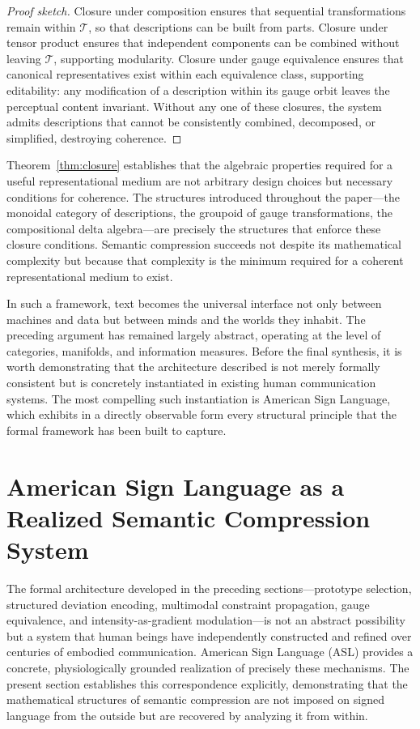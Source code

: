 \documentclass[11pt,a4paper]{article}
\theoremstyle{definition}
\theoremstyle{remark}
\begin{document}
\begin{proof}[Proof sketch]
Closure under composition ensures that sequential transformations remain within $\mathcal{T}$, so that descriptions can be built from parts. Closure under tensor product ensures that independent components can be combined without leaving $\mathcal{T}$, supporting modularity. Closure under gauge equivalence ensures that canonical representatives exist within each equivalence class, supporting editability: any modification of a description within its gauge orbit leaves the perceptual content invariant. Without any one of these closures, the system admits descriptions that cannot be consistently combined, decomposed, or simplified, destroying coherence.
\end{proof}

Theorem~\ref{thm:closure} establishes that the algebraic properties required for a useful representational medium are not arbitrary design choices but necessary conditions for coherence. The structures introduced throughout the paper---the monoidal category of descriptions, the groupoid of gauge transformations, the compositional delta algebra---are precisely the structures that enforce these closure conditions. Semantic compression succeeds not despite its mathematical complexity but because that complexity is the minimum required for a coherent representational medium to exist.

In such a framework, text becomes the universal interface not only between machines and data but between minds and the worlds they inhabit. The preceding argument has remained largely abstract, operating at the level of categories, manifolds, and information measures. Before the final synthesis, it is worth demonstrating that the architecture described is not merely formally consistent but is concretely instantiated in existing human communication systems. The most compelling such instantiation is American Sign Language, which exhibits in a directly observable form every structural principle that the formal framework has been built to capture.

\section{American Sign Language as a Realized Semantic Compression System}
\label{sec:asl_bridge}

The formal architecture developed in the preceding sections---prototype selection, structured deviation encoding, multimodal constraint propagation, gauge equivalence, and intensity-as-gradient modulation---is not an abstract possibility but a system that human beings have independently constructed and refined over centuries of embodied communication. American Sign Language (ASL) provides a concrete, physiologically grounded realization of precisely these mechanisms. The present section establishes this correspondence explicitly, demonstrating that the mathematical structures of semantic compression are not imposed on signed language from the outside but are recovered by analyzing it from within.
\end{document}
